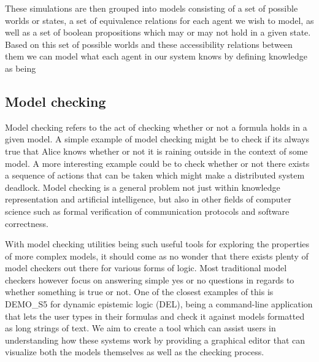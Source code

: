 These simulations are then grouped into models consisting of a set of possible worlds or states, a set of equivalence relations for each agent we wish to model, as well as a set of boolean propositions which may or may not hold in a given state. Based on this set of possible worlds and these accessibility relations between them we can model what each agent in our system knows by defining knowledge as being 


\subsection{Model checking}

Model checking refers to the act of checking whether or not a formula holds in a given model. A simple example of model checking might be to check if its always true that Alice knows whether or not it is raining outside in the context of some model. A more interesting example could be to check whether or not there exists a sequence of actions that can be taken which might make a distributed system deadlock. Model checking is a general problem not just within knowledge representation and artificial intelligence, but also in other fields of computer science such as formal verification of communication protocols and software correctness.

With model checking utilities being such useful tools for exploring the properties of more complex models, it should come as no wonder that there exists plenty of model checkers out there for various forms of logic. Most traditional model checkers however focus on answering simple yes or no questions in regards to whether something is true or not. One of the closest examples of this is DEMO\_S5 for dynamic epistemic logic (DEL), being a command-line application that lets the user types in their formulas and check it against models formatted as long strings of text. We aim to create a tool which can assist users in understanding how these systems work by providing a graphical editor that can visualize both the models themselves as well as the checking process.



